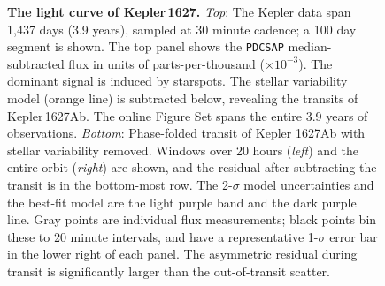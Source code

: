 \documentclass[12pt,modern,twocolumn,tighten]{aastex63}
\newcommand{\pn}{Kepler\,1627Ab} %
\begin{document}
\begin{figure}[tp]
\begin{center}
		\vspace{-0.2cm}	
	\end{center}
	\vspace{-0.7cm}
  \caption{ {\bf The light curve of Kepler\,1627.}
    {\it Top}: 
    The Kepler data span 1{,}437 days (3.9 years), sampled at
    30 minute cadence;  a 100 day segment is shown.  The
    top panel shows the \texttt{PDCSAP} median-subtracted flux in
    units of parts-per-thousand ($\times 10^{-3}$).  The dominant
    signal is induced by starspots.  The stellar
    variability model (orange line) is subtracted below, revealing the
    transits of \pn.  The
    online Figure Set spans the entire 3.9 years of observations.
    {\it Bottom}:
    Phase-folded transit of Kepler 1627Ab with stellar variability
    removed.  Windows over 20 hours ({\it left}) and the entire orbit
    ({\it right}) are shown, and the residual after subtracting the
    transit is in the bottom-most row.  The 2-$\sigma$ model uncertainties
    and the best-fit model are the light purple band and the dark
    purple line.  Gray points are individual flux measurements; black
    points bin these to 20 minute intervals, and have a representative
    1-$\sigma$ error bar in the lower right of each panel.  The asymmetric
    residual during transit is significantly larger than the out-of-transit scatter.
    \label{fig:lc}
  }
\end{figure}
\end{document}
